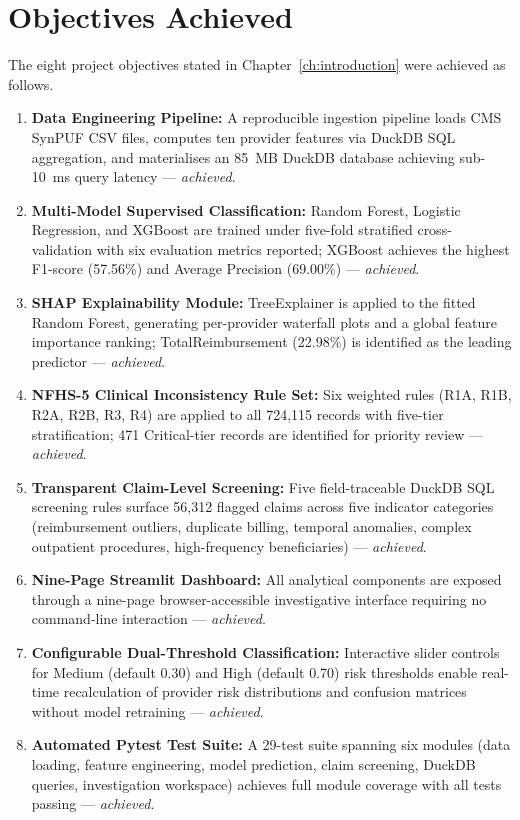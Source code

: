 \section{Objectives Achieved}

The eight project objectives stated in Chapter~\ref{ch:introduction} were achieved as follows.

\begin{enumerate}
    \item \textbf{Data Engineering Pipeline:} A reproducible ingestion pipeline loads CMS SynPUF CSV files, computes ten provider features via DuckDB SQL aggregation, and materialises an 85~MB DuckDB database achieving sub-10~ms query latency --- \textit{achieved}.

    \item \textbf{Multi-Model Supervised Classification:} Random Forest, Logistic Regression, and XGBoost are trained under five-fold stratified cross-validation with six evaluation metrics reported; XGBoost achieves the highest F1-score (57.56\%) and Average Precision (69.00\%) --- \textit{achieved}.

    \item \textbf{SHAP Explainability Module:} TreeExplainer is applied to the fitted Random Forest, generating per-provider waterfall plots and a global feature importance ranking; TotalReimbursement (22.98\%) is identified as the leading predictor --- \textit{achieved}.

    \item \textbf{NFHS-5 Clinical Inconsistency Rule Set:} Six weighted rules (R1A, R1B, R2A, R2B, R3, R4) are applied to all 724,115 records with five-tier stratification; 471 Critical-tier records are identified for priority review --- \textit{achieved}.

    \item \textbf{Transparent Claim-Level Screening:} Five field-traceable DuckDB SQL screening rules surface 56,312 flagged claims across five indicator categories (reimbursement outliers, duplicate billing, temporal anomalies, complex outpatient procedures, high-frequency beneficiaries) --- \textit{achieved}.

    \item \textbf{Nine-Page Streamlit Dashboard:} All analytical components are exposed through a nine-page browser-accessible investigative interface requiring no command-line interaction --- \textit{achieved}.

    \item \textbf{Configurable Dual-Threshold Classification:} Interactive slider controls for Medium (default 0.30) and High (default 0.70) risk thresholds enable real-time recalculation of provider risk distributions and confusion matrices without model retraining --- \textit{achieved}.

    \item \textbf{Automated Pytest Test Suite:} A 29-test suite spanning six modules (data loading, feature engineering, model prediction, claim screening, DuckDB queries, investigation workspace) achieves full module coverage with all tests passing --- \textit{achieved}.
\end{enumerate}

